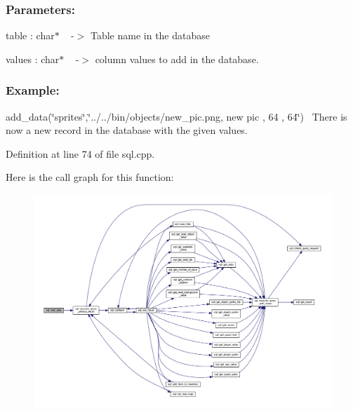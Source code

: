 \subsubsection*{Parameters\+: }

table \+: char$\ast$ ~\newline
-\/$>$ Table name in the database

values \+: char$\ast$ ~\newline
-\/$>$ column values to add in the database.

\subsubsection*{Example\+: }

add\+\_\+data(\char`\"{}sprites\char`\"{},\char`\"{}\textquotesingle{}../../bin/objects/new\+\_\+pic.\+png\textquotesingle{}, new pic , 64 , 64\char`\"{})~\newline
There is now a new record in the database with the given values. 

Definition at line 74 of file sql.\+cpp.

Here is the call graph for this function\+:
\nopagebreak
\begin{figure}[H]
\begin{center}
\leavevmode
\includegraphics[width=350pt]{classsql_a94c4df2d61461e99d3767f1b37163c2f_cgraph}
\end{center}
\end{figure}
\mbox{\label{classsql_af0e753f3af81ff1ff7f7582dcea4b0ed}} 
